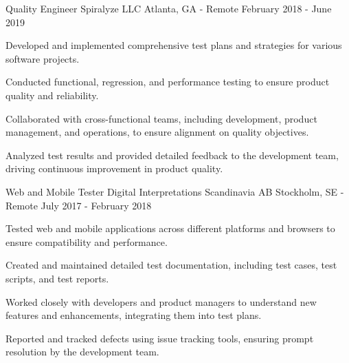 \begin{cventries}
  \cventry
    {Quality Engineer} %
    {Spiralyze LLC} %
    {Atlanta, GA - Remote} %
    {February 2018 - June 2019} %
    {
      \begin{cvitems} %
        \item {Developed and implemented comprehensive test plans and strategies for various software projects.}
        \item {Conducted functional, regression, and performance testing to ensure product quality and reliability.}
        \item {Collaborated with cross-functional teams, including development, product management, and operations, to ensure alignment on quality objectives.}
        \item {Analyzed test results and provided detailed feedback to the development team, driving continuous improvement in product quality.}
      \end{cvitems}
    }

  \cventry
  {Web and Mobile Tester} %
  {Digital Interpretations Scandinavia AB} %
  {Stockholm, SE - Remote} %
  {July 2017 - February 2018} %
  {
    \begin{cvitems} %
      \item {Tested web and mobile applications across different platforms and browsers to ensure compatibility and performance.}
      \item {Created and maintained detailed test documentation, including test cases, test scripts, and test reports.}
      \item {Worked closely with developers and product managers to understand new features and enhancements, integrating them into test plans.}
      \item {Reported and tracked defects using issue tracking tools, ensuring prompt resolution by the development team.}
    \end{cvitems}
  }


\end{cventries}
